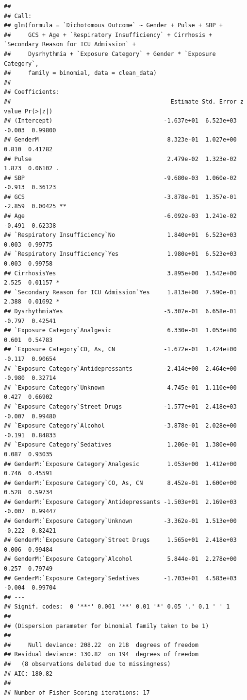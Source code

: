 \documentclass[
]{article}
\begin{document}
\begin{verbatim}
## 
## Call:
## glm(formula = `Dichotomous Outcome` ~ Gender + Pulse + SBP + 
##     GCS + Age + `Respiratory Insufficiency` + Cirrhosis + `Secondary Reason for ICU Admission` + 
##     Dysrhythmia + `Exposure Category` + Gender * `Exposure Category`, 
##     family = binomial, data = clean_data)
## 
## Coefficients:
##                                              Estimate Std. Error z value Pr(>|z|)   
## (Intercept)                                -1.637e+01  6.523e+03  -0.003  0.99800   
## GenderM                                     8.323e-01  1.027e+00   0.810  0.41782   
## Pulse                                       2.479e-02  1.323e-02   1.873  0.06102 . 
## SBP                                        -9.680e-03  1.060e-02  -0.913  0.36123   
## GCS                                        -3.878e-01  1.357e-01  -2.859  0.00425 **
## Age                                        -6.092e-03  1.241e-02  -0.491  0.62338   
## `Respiratory Insufficiency`No               1.840e+01  6.523e+03   0.003  0.99775   
## `Respiratory Insufficiency`Yes              1.980e+01  6.523e+03   0.003  0.99758   
## CirrhosisYes                                3.895e+00  1.542e+00   2.525  0.01157 * 
## `Secondary Reason for ICU Admission`Yes     1.813e+00  7.590e-01   2.388  0.01692 * 
## DysrhythmiaYes                             -5.307e-01  6.658e-01  -0.797  0.42541   
## `Exposure Category`Analgesic                6.330e-01  1.053e+00   0.601  0.54783   
## `Exposure Category`CO, As, CN              -1.672e-01  1.424e+00  -0.117  0.90654   
## `Exposure Category`Antidepressants         -2.414e+00  2.464e+00  -0.980  0.32714   
## `Exposure Category`Unknown                  4.745e-01  1.110e+00   0.427  0.66902   
## `Exposure Category`Street Drugs            -1.577e+01  2.418e+03  -0.007  0.99480   
## `Exposure Category`Alcohol                 -3.878e-01  2.028e+00  -0.191  0.84833   
## `Exposure Category`Sedatives                1.206e-01  1.380e+00   0.087  0.93035   
## GenderM:`Exposure Category`Analgesic        1.053e+00  1.412e+00   0.746  0.45591   
## GenderM:`Exposure Category`CO, As, CN       8.452e-01  1.600e+00   0.528  0.59734   
## GenderM:`Exposure Category`Antidepressants -1.503e+01  2.169e+03  -0.007  0.99447   
## GenderM:`Exposure Category`Unknown         -3.362e-01  1.513e+00  -0.222  0.82421   
## GenderM:`Exposure Category`Street Drugs     1.565e+01  2.418e+03   0.006  0.99484   
## GenderM:`Exposure Category`Alcohol          5.844e-01  2.278e+00   0.257  0.79749   
## GenderM:`Exposure Category`Sedatives       -1.703e+01  4.583e+03  -0.004  0.99704   
## ---
## Signif. codes:  0 '***' 0.001 '**' 0.01 '*' 0.05 '.' 0.1 ' ' 1
## 
## (Dispersion parameter for binomial family taken to be 1)
## 
##     Null deviance: 208.22  on 218  degrees of freedom
## Residual deviance: 130.82  on 194  degrees of freedom
##   (8 observations deleted due to missingness)
## AIC: 180.82
## 
## Number of Fisher Scoring iterations: 17
\end{verbatim}
\end{document}
